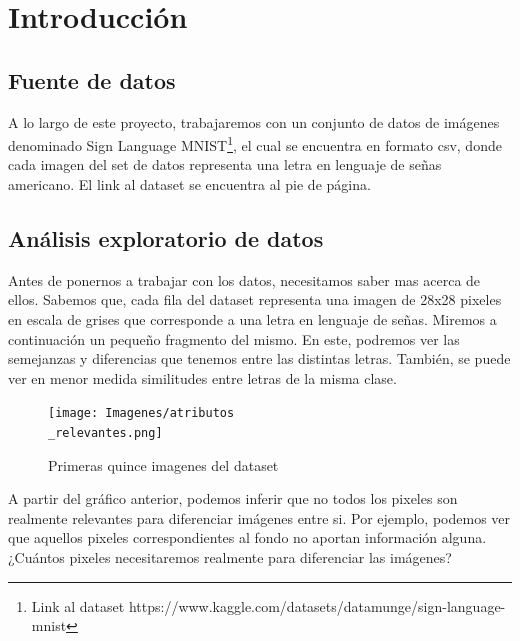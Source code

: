 \documentclass[10pt,a4paper]{article}
\begin{document}
\maketitle

\section{Introducción}  \vspace{0.1cm}

\subsection{Fuente de datos} \vspace{0.2cm}

A lo largo de este proyecto, trabajaremos con un conjunto de datos de imágenes denominado Sign
Language MNIST\footnote{Link al dataset https://www.kaggle.com/datasets/datamunge/sign-language-mnist}, el cual se encuentra en formato csv, donde cada imagen del set de datos representa una letra en lenguaje de señas americano. El link al dataset se encuentra al pie de página.

\subsection{Análisis exploratorio de datos}  \vspace{0.2cm}

Antes de ponernos a trabajar con los datos, necesitamos saber mas acerca de ellos. Sabemos que, cada fila del dataset representa una imagen de 28x28 pixeles en escala de grises que corresponde a una letra en lenguaje de señas. Miremos a continuación un pequeño fragmento del mismo. En este, podremos ver las semejanzas y diferencias que tenemos entre las distintas letras. También, se puede ver en menor medida similitudes entre letras de la misma clase.

 \vspace{0.2cm}

\begin{figure}[h]
  \centering
  \texttt{[image: Imagenes/atributos\\\_relevantes.png]}
  \caption{Primeras quince imagenes del dataset}
  \label{fig:Tabla 1}
\end{figure}

 \vspace{0.2cm}

A partir del gráfico anterior, podemos inferir que no todos los pixeles son realmente relevantes para diferenciar imágenes entre si. Por ejemplo, podemos ver
que aquellos pixeles correspondientes al fondo no aportan información alguna. ¿Cuántos pixeles necesitaremos realmente para diferenciar las imágenes? \vspace{0.05cm}
\end{document}
